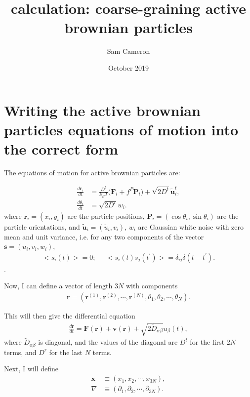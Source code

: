 \documentclass{article}
\title{calculation: coarse-graining active brownian particles}
\author{Sam Cameron}
\date{October 2019}
\begin{document}
\maketitle

\section{Writing the active brownian particles equations of motion into the correct form}



The equations of motion for active brownian particles are:

\begin{align}
  \frac{d\bm{r}_i}{dt}&=\frac{D^t}{k_BT}\big(\bm{F}_i
                        +f^P\bm{P}_i\big)
                        +\sqrt{2D^t}\tilde{\bm{u}}_i^t,\label{eq:micro_pos}\\
    \frac{d\theta_i}{dt}&=\sqrt{2D^r}w_i.\label{eq:micro_theta}
\end{align}
where $\bm{r}_i=(x_i,y_i)$ are the particle positions,
$\bm{P}_i=(\cos\theta_i,\sin\theta_i)$ are the particle orientations,
and $\tilde{\bm{u}}_i=(\tilde{u}_i,v_i)$, $w_i$ are Gaussian white noise
with zero mean and unit variance, i.e. for any two components of the vector
$\bm{s}=(u_i,v_i,w_i)$,
\begin{align}
  \big<s_i(t)\big>=0;\;\;\;\;\; \big<s_i(t)s_j(t^{\prime})\big>=
  \delta_{ij}\delta(t-t^{\prime}).
\end{align}.

Now, I can define a vector of length $3N$ with components
\begin{align}
  \bm{r}=(\bm{r}^{(1)},\bm{r}^{(2)},\cdots,\bm{r}^{(N)},\theta_1,\theta_2,\cdots,
  \theta_N).
\end{align}

This will then give the differential equation
\begin{align}
  \frac{d\bm{r}}{dt}=\bm{F}(\bm{r})+\bm{v}(\bm{r})
  +\sqrt{2\tilde{D}_{\alpha\beta}}u_{\beta}(t),
\end{align}
where $\tilde{D}_{\alpha\beta}$ is diagonal, and the values of the diagonal are
$D^t$ for the first $2N$ terms, and $D^r$ for the last $N$ terms.

Next, I will define
\begin{align}
  \bm{x}&\equiv(x_1,x_2,\cdots,x_{3N}),\\
  \nabla&\equiv(\partial_1,\partial_2,\cdots,\partial_{3N}).
\end{align}
\end{document}
